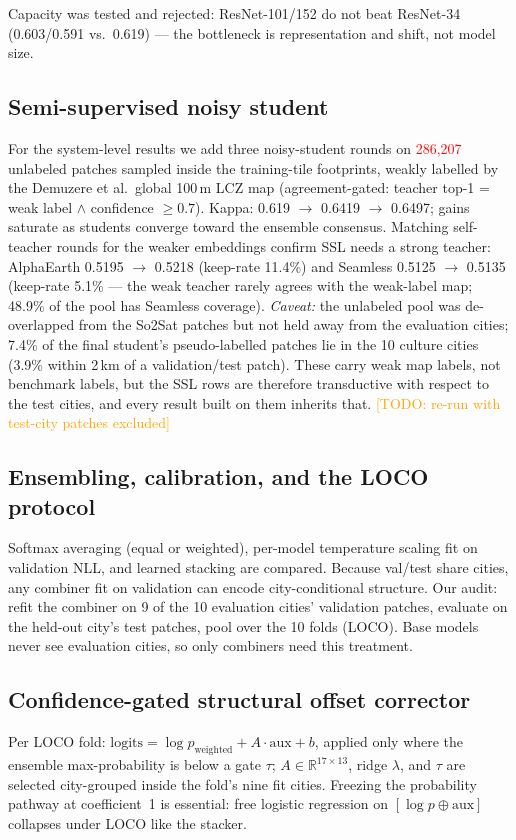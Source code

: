\documentclass[11pt]{article}
\newif\ifverified
\newcommand{\uv}[1]{\ifverified#1\else\textcolor{red}{#1}\fi}
\newcommand{\todo}[1]{\textcolor{orange}{[TODO: #1]}}
\begin{document}
Capacity was tested and rejected: ResNet-101/152 do not beat
ResNet-34 (0.603/0.591 vs.\ 0.619) --- the bottleneck
is representation and shift, not model size.

\subsection{Semi-supervised noisy student}\label{sec:methods-ssl}
For the system-level results we add three noisy-student rounds
\citep{xie2020noisy} on \uv{286{,}207} unlabeled patches sampled
inside the training-tile footprints, weakly labelled by the Demuzere
et al.\ global 100\,m LCZ map \citep{demuzere2022lcz}
(agreement-gated: teacher top-1 = weak label $\wedge$ confidence
$\geq 0.7$). Kappa: 0.619 $\to$ 0.6419 $\to$ 0.6497;
gains saturate as students converge toward the ensemble consensus.
Matching self-teacher rounds for the weaker embeddings confirm SSL
needs a strong teacher: AlphaEarth 0.5195 $\to$ 0.5218 (keep-rate
11.4\%) and Seamless 0.5125 $\to$ 0.5135 (keep-rate 5.1\% --- the
weak teacher rarely agrees with the weak-label map; 48.9\% of the
pool has Seamless coverage).
\emph{Caveat:} the unlabeled pool was de-overlapped from the So2Sat
patches but not held away from the evaluation cities; 7.4\% of the
final student's pseudo-labelled patches lie in the 10 culture cities
(3.9\% within 2\,km of a validation/test patch). These carry weak
map labels, not benchmark labels, but the SSL rows are therefore
transductive with respect to the test cities, and every result built
on them inherits that. \todo{re-run with test-city patches excluded}

\subsection{Ensembling, calibration, and the LOCO protocol}
\label{sec:methods-loco}
Softmax averaging (equal or weighted), per-model temperature scaling
fit on validation NLL, and learned stacking are compared. Because
val/test share cities, any combiner fit on validation can encode
city-conditional structure. Our audit: refit the combiner on 9 of the
10 evaluation cities' validation patches, evaluate on the held-out
city's test patches, pool over the 10 folds (LOCO). Base models never
see evaluation cities, so only combiners need this treatment.

\subsection{Confidence-gated structural offset corrector}
\label{sec:methods-aux}
Per LOCO fold: $\text{logits} = \log p_{\text{weighted}} + A \cdot
\text{aux} + b$, applied only where the ensemble max-probability is
below a gate $\tau$; $A \in \mathbb{R}^{17\times 13}$, ridge
$\lambda$, and $\tau$ are selected city-grouped inside the fold's
nine fit cities. Freezing the probability pathway at coefficient~1 is
essential: free logistic regression on $[\log p \oplus \text{aux}]$
collapses under LOCO like the stacker.
\end{document}
